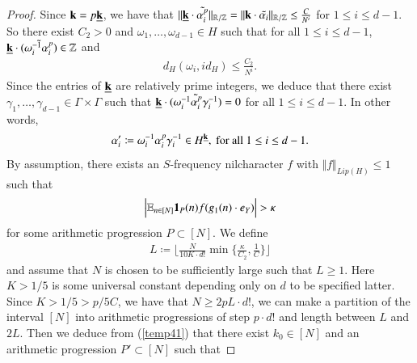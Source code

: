 \documentclass[12pt,amstex]{amsart}
\theoremstyle{definition}
\def \A {\alpha}
\def \D {\kappa}
\def \k {\bold{k}}
\begin{document}
\begin{proof}
Since $\k=p\underline{\k}$,
 we have that $\Vert\underline{\k}\cdot\tilde{\A_{i}^{p}}\Vert_{\mathbb{R}/\mathbb{Z}}
 =\Vert\k\cdot\tilde{\A_{i}}\Vert_{\mathbb{R}/\mathbb{Z}}\leq\frac{C}{N^{i}}$ for $1\leq i\leq d-1$. So there exist $C_{2}>0$ and $\omega_{1},\dots,\omega_{d-1}\in H$ such that for all $1\leq i\leq d-1$, $\underline{\k}\cdot\tilde{(\omega_{i}^{-1}\A_{i}^{p})}\in\mathbb{Z}$ and
 \begin{equation}\nonumber
   \begin{split}
     d_{H}(\omega_{i},id_{H})\leq\frac{C_{2}}{N^{i}}.
   \end{split}
 \end{equation}
 Since the entries of $\underline{\k}$ are relatively prime integers, we deduce that there exist $\gamma_{1},\dots,\gamma_{d-1}\in\Gamma\times\Gamma$ such that
 $\underline{\k}\cdot\tilde{(\omega_{i}^{-1}\A_{i}^{p}\gamma_{i}^{-1})}=0$ for all $1\leq i\leq d-1$. In other words,
 \begin{equation}\nonumber
    \begin{split}
     \A'_{i}\coloneqq \omega_{i}^{-1}\A_{i}^{p}\gamma_{i}^{-1}\in H^{\underline{\k}}, \text{ for all } 1\leq i\leq d-1.
    \end{split}
  \end{equation}
  By assumption, there exists an $S$-frequency nilcharacter $f$ with $\Vert f\Vert_{Lip(H)}\leq 1$ such that
   \begin{equation}\label{temp41}
    \begin{split}
     \Bigl\vert\mathbb{E}_{n\in[N]}\bold{1}_{P}(n)f(g_{1}(n)\cdot e_{Y})\Bigr\vert>\D
    \end{split}
  \end{equation}
  for some arithmetic progression $P\subset[N]$.
We define
 \begin{equation}\nonumber
    \begin{split}
     L\coloneqq \lfloor\frac{N}{10K\cdot d!}\min\{\frac{\D}{C_{2}},\frac{1}{C}\}\rfloor
    \end{split}
  \end{equation}
  and assume that $N$ is chosen to be sufficiently large such that $L\geq 1$. Here $K>1/5$ is some universal constant depending only on $d$ to be specified latter. Since $K>1/5>p/5C$, we have that $N\geq 2pL\cdot d!$, we can make a partition of the interval $[N]$ into arithmetic
 progressions of step $p\cdot d!$ and length between $L$ and $2L$. Then we deduce from (\ref{temp41}) that there exist $k_{0}\in[N]$ and an arithmetic
progression $P'\subset[N]$ such that

\end{proof}
\end{document}
